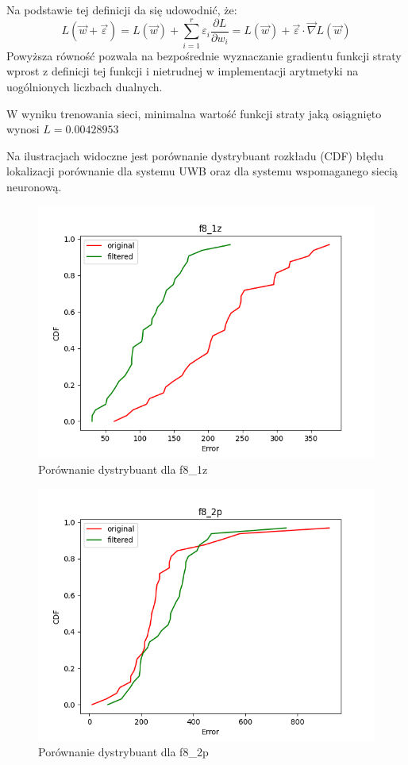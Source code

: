 \documentclass{classrep}
\begin{document}
{Na podstawie tej definicji da się udowodnić, że:
$$L(\vec{w}+\vec{\varepsilon}) = L(\vec{w}) + \sum_{i=1}^{r} \varepsilon_{i} \frac{\partial L}{\partial w_i} = L(\vec{w}) + \vec{\varepsilon} \cdot \vec{\nabla}L(\vec{w})$$
Powyższa równość pozwala na bezpośrednie wyznaczanie gradientu funkcji straty wprost z definicji tej funkcji i nietrudnej w implementacji arytmetyki na uogólnionych liczbach dualnych.

W wyniku trenowania sieci, minimalna wartość funkcji straty jaką osiągnięto wynosi $L=0.00428953$ 

Na ilustracjach widoczne jest porównanie dystrybuant rozkładu (CDF) błędu lokalizacji \ppauza porównanie dla systemu UWB oraz dla systemu wspomaganego siecią neuronową.

\begin{figure}[!htbp]
            \centering
            \includegraphics[width=\textwidth, width=90mm]{comparison_f8_1z.png}
            \caption{Porównanie dystrybuant dla f8\_1z}
            \label{comparison_f8_1z}
    \end{figure}

\begin{figure}[!htbp]
            \centering
            \includegraphics[width=\textwidth, width=90mm]{comparison_f8_2p.png}
            \caption{Porównanie dystrybuant dla f8\_2p}
            \label{comparison_f8_2p}
    \end{figure}

}
\end{document}

